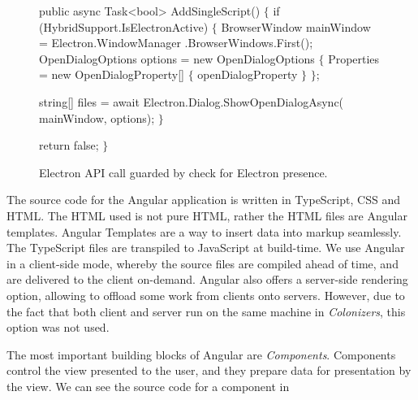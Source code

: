 \begin{figure}[ht]
\begin{code}[commandchars=\\\{\},codes={\catcode`\$=3\catcode`\^=7\catcode`\_=8}]
public async Task<bool> AddSingleScript()
$\{$
    if (HybridSupport.IsElectronActive)
    $\{$
        BrowserWindow mainWindow = Electron.WindowManager
            .BrowserWindows.First();
        OpenDialogOptions options = new OpenDialogOptions
        $\{$
            Properties = new OpenDialogProperty[] $\{$
                    openDialogProperty
                $\}$
        $\}$;

        string[] files = await Electron.Dialog.ShowOpenDialogAsync(
            mainWindow, options);
    $\}$

    return false;
$\}$
\end{code}
\caption{Electron API call guarded by check for Electron presence.}\label{dd:electronguard}
\end{figure}

The source code for the Angular application is written in TypeScript, CSS and HTML.
The HTML used is not pure HTML, rather the HTML files are Angular templates.
Angular Templates are a way to insert data into markup seamlessly.
The TypeScript files are transpiled to JavaScript at build-time.
We use Angular in a client-side mode, whereby the source files are compiled
ahead of time, and are delivered to the client on-demand. Angular also
offers a server-side rendering option, allowing to offload some work
from clients onto servers. However, due to the fact that both client and server
run on the same machine in \emph{Colonizers}, this option was not used.

The most important building blocks of Angular are \emph{Components}.
Components control the view presented to the user, and they prepare
data for presentation by the view. We can see the source code for a component
in 


